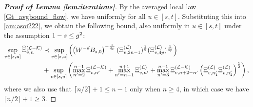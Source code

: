 \begin{proof}[\bf Proof of Lemma \ref{lem:iterations}]
By the averaged local law \eqref{Gt_avgbound_flow}, we have  uniformly for all $u\in[s,t]$. Substituting this into \eqref{am;asoi222}, we obtain the following bound, also uniformly in $u\in [s,t]$ under the assumption $1-s\le g^2$: 
\begin{align}\label{am;asoi333}
\sup_{v\in[s,u]} \widehat \Xi^{({\mathcal L-\mathcal K})}_{v,n}&\prec \sup_{v\in[s,u]} \left(\left({W^{-d}B_{s,0}}\right)^{-\frac{1}{4p}}(\Xi^{(\mathcal L)}_{v, {2n-1}})^{\frac 1 2}(\Xi^{(\mathcal L)}_{v, 4p})^{\frac{1}{4p}}\right) \\
&+\sup_{v\in [s,u]}
\left( \max_{n'=2}^{n-1}\Xi^{({\mathcal L-\mathcal K})}_{v,n'}+\max_{n'=n-1}^{n+1}\Xi^{({\mathcal L})}_{v,n'}+\max_{n'=3}^{n-1} \Xi^{({\mathcal L-\mathcal K})}_{v,n+2-n'} \left({\Xi^{({\mathcal L})}_{v,n_1'} \Xi^{({\mathcal L})}_{v,n_2'}}\right)^{\frac 12 } \right),\nonumber
\end{align}
where we also use that $\lceil n/2\rceil + 1\le n-1$ only when $n\ge 4$, in which case we have $\lceil n/2\rceil + 1\ge 3$. 


\end{proof}
